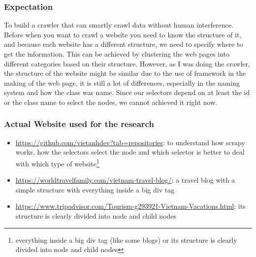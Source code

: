 \documentclass[11pt,a4paper]{report}
\begin{document}
	\subsubsection{Expectation}
	To build a crawler that can smartly crawl data without human interference. Before when you want to crawl a website you need to know the structure of it, and because each website has a different structure, we need to specify where to get the information. This can be achieved by clustering the web pages into different categories based on their structure. However, as I was doing the crawler, the structure of the website might be similar due to the use of framework in the making of the web page, it is still a lot of differences, especially in the naming system and how the class was name. Since our selectors depend on at least the id or the class name to select the nodes, we cannot achieved it right now.
	\subsubsection{Actual Website used for the research}
	\begin{itemize}
		\item \url{https://github.com/vietanhdev?tab=repositories}: to understand how scrapy works, how the selectors select the node and which selector is better to deal with which type of website\footnote{everything inside a big div tag (like some blogs) or its structure is clearly divided into node and child nodes}
		\item \url{https://worldtravelfamily.com/vietnam-travel-blog/}: a travel blog with a simple structure with everything inside a big div tag
		\item \url{https://www.tripadvisor.com/Tourism-g293921-Vietnam-Vacations.html}: its structure is clearly divided into node and child nodes
	\end{itemize}
\end{document}
